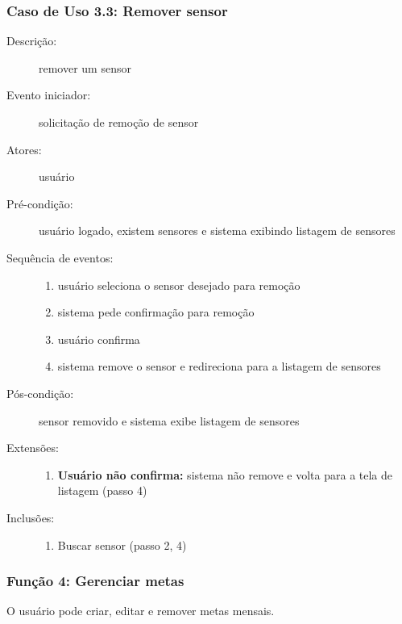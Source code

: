 \subsubsection{Caso de Uso 3.3: Remover sensor}
\begin{description}
	\item[Descrição:] remover um sensor
	\item[Evento iniciador:] solicitação de remoção de sensor
	\item[Atores:] usuário
	\item[Pré-condição:] usuário logado, existem sensores e sistema exibindo listagem de sensores
	\item[Sequência de eventos:] \hfill
		\begin{enumerate}
			\item{usuário seleciona o sensor desejado para remoção}
			\item{sistema pede confirmação para remoção}
			\item{usuário confirma}
			\item{sistema remove o sensor e redireciona para a listagem de sensores}
		\end{enumerate}
	\item[Pós-condição:] sensor removido e sistema exibe listagem de sensores
	\item[Extensões:] \hfill
		\begin{enumerate}
			\item{\textbf{Usuário não confirma:} sistema não remove e volta para a tela de listagem (passo 4)}
		\end{enumerate}
	\item[Inclusões:] \hfill
		\begin{enumerate}
			\item{Buscar sensor (passo 2, 4)}
		\end{enumerate}
\end{description}
\subsubsection{Função 4: Gerenciar metas}
O usuário pode criar, editar e remover metas mensais.
%
